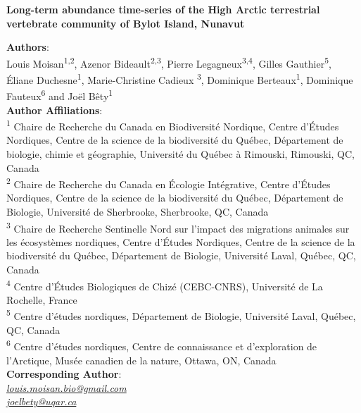 \documentclass[a4paper,twoside,10pt]{article}
\begin{document}
 
\begingroup  
  \centering
\textbf{Long-term abundance time-series of the High Arctic terrestrial vertebrate community of Bylot Island, Nunavut}\\[1.5em]
\endgroup

\textbf{Authors}:\\
 Louis Moisan\textsuperscript{1,2}, Azenor Bideault\textsuperscript{2,3}, Pierre Legagneux\textsuperscript{3,4}, Gilles Gauthier\textsuperscript{5}, Éliane Duchesne\textsuperscript{1}, Marie-Christine Cadieux \textsuperscript{3}, Dominique Berteaux\textsuperscript{1}, Dominique Fauteux\textsuperscript{6} and Joël Bêty\textsuperscript{1}\\[1.5em]

\textbf{Author Affiliations}:\\
\textsuperscript{1} Chaire de Recherche du Canada en Biodiversité Nordique, Centre d’Études Nordiques, Centre de la science de la biodiversité du Québec, Département de biologie, chimie et géographie, Université du Québec à Rimouski, Rimouski, QC, Canada\\
\textsuperscript{2} Chaire de Recherche du Canada en Écologie Intégrative, Centre d’Études Nordiques, Centre de la science de la biodiversité du Québec, Département de Biologie, Université de Sherbrooke, Sherbrooke, QC, Canada\\
\textsuperscript{3} Chaire de Recherche Sentinelle Nord sur l’impact des migrations animales sur les écosystèmes nordiques, Centre d’Études Nordiques, Centre de la science de la biodiversité du Québec, Département de Biologie, Université Laval, Québec, QC, Canada\\
\textsuperscript{4} Centre d’Études Biologiques de Chizé (CEBC-CNRS), Université de La Rochelle, France \\
\textsuperscript{5} Centre d’études nordiques, Département de Biologie, Université Laval, Québec, QC, Canada\\
\textsuperscript{6} Centre d’études nordiques, Centre de connaissance et d’exploration de l’Arctique, Musée canadien de la nature, Ottawa, ON, Canada
\\[1.5em]

\textbf{Corresponding Author}:\\
\textit{\href{mailto:louis.moisan.bio@gmail.com}{louis.moisan.bio@gmail.com}}\\
\textit{\href{mailto:joel_bety@uqar.ca}{joel{\textunderscore}bety@uqar.ca}}
\\[1.5em]
 
\end{document}
